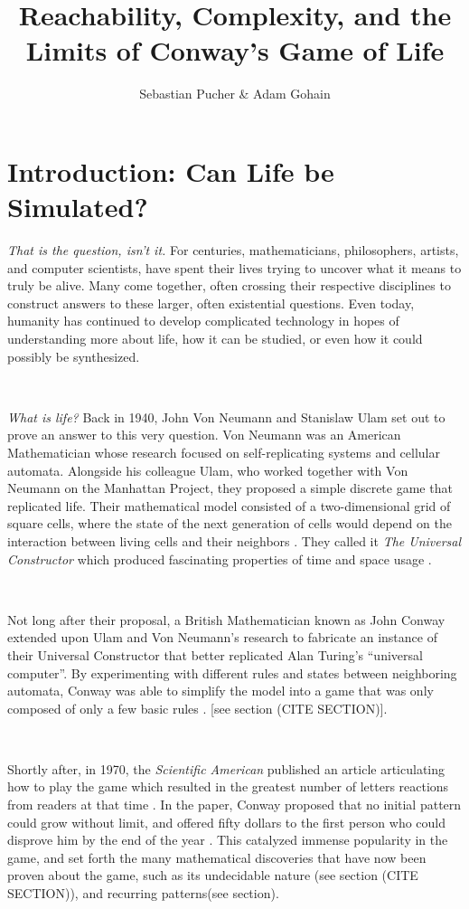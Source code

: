 \documentclass{article}
\title{Reachability, Complexity, and the Limits of Conway's Game of Life}
\author{Sebastian Pucher \& Adam Gohain}
\theoremstyle{definition}
\theoremstyle{plain}
\theoremstyle{plain}
\begin{document}
\maketitle

\tableofcontents

\newpage

\section{Introduction: Can Life be Simulated?}
  \textit{    That is the question, isn't it.} For centuries, mathematicians, philosophers, artists, and computer scientists, have spent their lives trying to uncover what it means to truly be alive. Many come together, often crossing their respective disciplines to construct answers to these larger, often existential questions. Even today, humanity has continued to develop complicated technology in hopes of understanding more about life, how it can be studied, or even how it could possibly be synthesized.

\

\textit{What is life?} Back in 1940, John Von Neumann and Stanislaw Ulam set out to prove an answer to this very question. Von Neumann was an American Mathematician whose research focused on self-replicating systems and cellular automata. Alongside his colleague Ulam, who worked together with Von Neumann on the Manhattan Project, they proposed a simple discrete game that replicated life. Their mathematical model consisted of a two-dimensional grid of square cells, where the state of the next generation of cells would depend on the interaction between living cells and their neighbors \cite{Beginning_Life_2006}. They called it \textit{The Universal Constructor} which produced fascinating properties of time and space usage \cite{Freitas_2004}.

\

Not long after their proposal, a British Mathematician known as John Conway extended upon Ulam and Von Neumann’s research to fabricate an instance of their Universal Constructor that better replicated Alan Turing’s “universal computer”. By experimenting with different rules and states between neighboring automata, Conway was able to simplify the model into a game that was only composed of only a few basic rules \cite{Beginning_Life_2006}. [see section (CITE SECTION)]. 

\

Shortly after, in 1970, the \textit{Scientific American} published an article articulating how to play the game which resulted in the greatest number of letters reactions from readers at that time \cite{Izhikevich_Conway_Seth}. In the paper, Conway proposed that no initial pattern could grow without limit, and offered fifty dollars to the first person who could disprove him by the end of the year \cite{math-games}. This catalyzed immense popularity in the game, and set forth the many mathematical discoveries that have now been proven about the game, such as its undecidable nature (see section (CITE SECTION)), and recurring patterns(see section).
\end{document}
